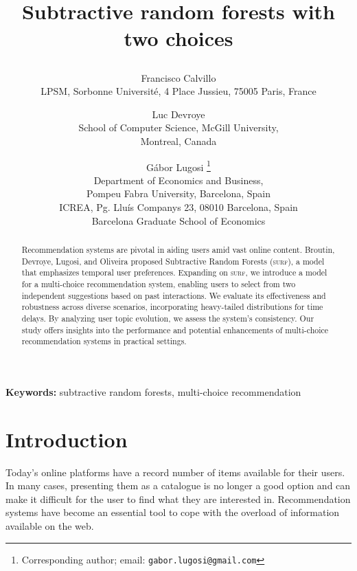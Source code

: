 \documentclass[12pt]{article}
\numberwithin{equation}{section} \font\titre=cmbx12
\begin{document}
\title{Subtractive random forests with two choices
 \author{
  Francisco Calvillo  \\
LPSM, Sorbonne Université, 4 Place Jussieu, 75005 Paris, France
  \and
  Luc Devroye \\
  School of Computer Science, McGill University, \\
  Montreal, Canada
\and
G\'abor Lugosi \thanks{Corresponding author; email: {\tt gabor.lugosi@gmail.com}}\\
Department of Economics and Business, \\
Pompeu  Fabra University, Barcelona, Spain \\
ICREA, Pg. Lluís Companys 23, 08010 Barcelona, Spain \\
Barcelona Graduate School of Economics
}
}


\maketitle


\begin{abstract}
  Recommendation systems are pivotal in aiding users amid vast online
  content. Broutin, Devroye, Lugosi, and Oliveira proposed
  Subtractive Random Forests (\textsc{surf}), a model that emphasizes
  temporal user preferences. Expanding on \textsc{surf}, we introduce
  a model for a multi-choice recommendation system, enabling users to select from
  two independent suggestions based on past interactions. We evaluate
  its effectiveness and robustness across diverse scenarios,
  incorporating heavy-tailed distributions for time delays. By
  analyzing user topic evolution, we assess the system's
  consistency. Our study offers insights into the performance and
  potential enhancements of multi-choice recommendation systems in
  practical settings.
\end{abstract}

\noindent
{\bf Keywords:} subtractive random forests, multi-choice recommendation

\section{Introduction}

Today's online platforms have a record number of items available for their users. In many cases, presenting them as a catalogue is no longer a good option and can make it difficult for the user to find what they are interested in.
Recommendation systems have become an essential tool to cope with the overload of information available on the web.
\end{document}

